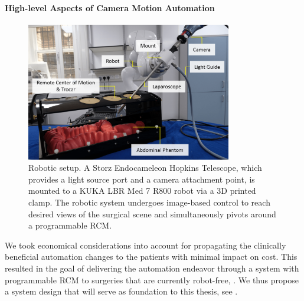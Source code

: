\paragraph{High-level Aspects of Camera Motion Automation}
\begin{figure}
	\centering
	\includegraphics[width=0.8\textwidth]{chapter_2/img/labeled_setup_compressed.png}
	\caption{Robotic setup. A Storz Endocameleon Hopkins Telescope, which provides a light source port and a camera attachment point, is mounted to a KUKA LBR Med 7 R800 robot via a 3D printed clamp. The robotic system undergoes image-based control to reach desired views of the surgical scene and simultaneously pivots around a programmable RCM.}
	\label{in:fig:experimental_setup}
\end{figure}
We took economical considerations into account for propagating the clinically beneficial automation changes to the patients with minimal impact on cost. This resulted in the goal of delivering the automation endeavor through a system with programmable RCM to surgeries that are currently robot-free, . We thus propose a system design that will serve as foundation to this thesis, see .

